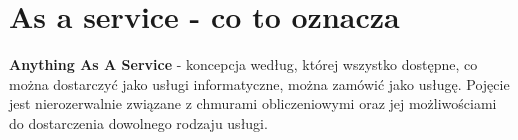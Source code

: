 \section{As a service - co to oznacza}
\label{chapter:monitoring_architecture:xaas}

\textbf{Anything As A Service} - koncepcja według, której wszystko dostępne, co można dostarczyć
jako usługi informatyczne, można zamówić jako usługę. Pojęcie jest nierozerwalnie związane z chmurami
obliczeniowymi oraz jej możliwościami do dostarczenia dowolnego rodzaju usługi.